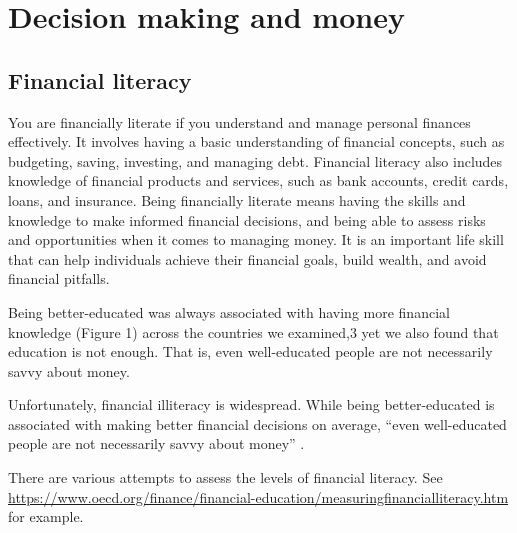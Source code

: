 \documentclass[
  12pt,
  oneside]{book}
\theoremstyle{definition}
\theoremstyle{definition}
\theoremstyle{definition}
\theoremstyle{definition}
\theoremstyle{remark}
\begin{document}
\hypertarget{decision-making-and-money}{%
\section{Decision making and money}\label{decision-making-and-money}}

\hypertarget{financial-literacy}{%
\subsection{Financial literacy}\label{financial-literacy}}

You are financially literate if you understand and manage personal finances effectively. It involves having a basic understanding of financial concepts, such as budgeting, saving, investing, and managing debt. Financial literacy also includes knowledge of financial products and services, such as bank accounts, credit cards, loans, and insurance.
Being financially literate means having the skills and knowledge to make informed financial decisions, and being able to assess risks and opportunities when it comes to managing money. It is an important life skill that can help individuals achieve their financial goals, build wealth, and avoid financial pitfalls.

Being better-educated was always associated with having more financial knowledge (Figure
1) across the countries we examined,3 yet we also found that education is not enough. That
is, even well-educated people are not necessarily savvy about money.

Unfortunately, financial illiteracy is widespread. While being better-educated is associated with making better financial decisions on average, ``even well-educated people are not necessarily savvy about money'' \citep[p.~3]{Mitchell2015Financial}.

There are various attempts to assess the levels of financial literacy. See \url{https://www.oecd.org/finance/financial-education/measuringfinancialliteracy.htm} for example.
\end{document}
